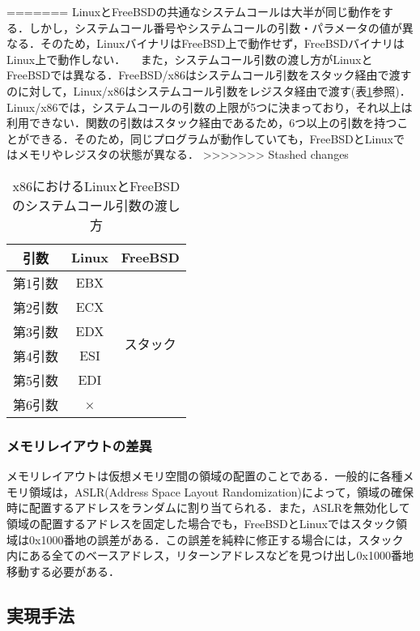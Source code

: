 \documentclass[11pt]{jarticle}
\begin{document}
=======
LinuxとFreeBSDの共通なシステムコールは大半が同じ動作をする．しかし，システムコール番号やシステムコールの引数・パラメータの値が異なる．そのため，LinuxバイナリはFreeBSD上で動作せず，FreeBSDバイナリはLinux上で動作しない．
　また，システムコール引数の渡し方がLinuxとFreeBSDでは異なる．FreeBSD/x86はシステムコール引数をスタック経由で渡すのに対して，Linux/x86はシステムコール引数をレジスタ経由で渡す(表\ref{tb:argument}参照)．Linux/x86では，システムコールの引数の上限が5つに決まっており，それ以上は利用できない．関数の引数はスタック経由であるため，6つ以上の引数を持つことができる．そのため，同じプログラムが動作していても，FreeBSDとLinuxではメモリやレジスタの状態が異なる．
>>>>>>> Stashed changes

\begin{table}
  \caption{x86におけるLinuxとFreeBSDのシステムコール引数の渡し方}
  \label{tb:argument}
  \begin{center}
  \begin{tabular}{|c|c|c|} \hline
    引数 & Linux & FreeBSD \\ \hline \hline
    第1引数 & EBX &\multirow{6}{*}{スタック}   \\ \cline{1-2}
    第2引数 & ECX &  \\ \cline{1-2}
    第3引数 & EDX &  \\ \cline{1-2}
    第4引数 & ESI & \\ \cline{1-2}
    第5引数 & EDI &  \\ \cline{1-2}
    第6引数 & × &  \\ \hline
  \end{tabular}
\end{center}
\end{table}

\subsubsection{メモリレイアウトの差異}
メモリレイアウトは仮想メモリ空間の領域の配置のことである．一般的に各種メモリ領域は，ASLR(Address Space Layout Randomization)によって，領域の確保時に配置するアドレスをランダムに割り当てられる．また，ASLRを無効化して領域の配置するアドレスを固定した場合でも，FreeBSDとLinuxではスタック領域は0x1000番地の誤差がある．この誤差を純粋に修正する場合には，スタック内にある全てのベースアドレス，リターンアドレスなどを見つけ出し0x1000番地移動する必要がある．


\subsection{実現手法}
\end{document}
